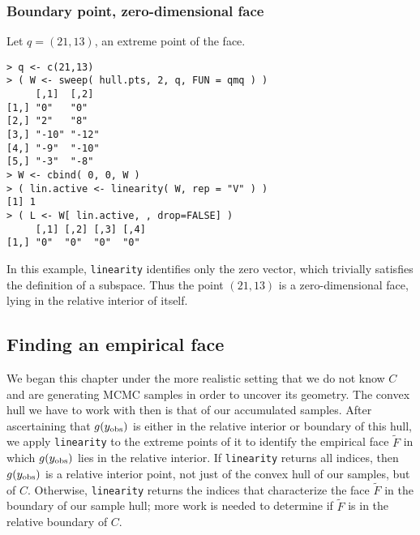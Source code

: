 \subsubsection{Boundary point, zero-dimensional face}
Let $q = (21,13)$, an extreme point of the face.
{ \singlespace
\begin{verbatim}
> q <- c(21,13)
> ( W <- sweep( hull.pts, 2, q, FUN = qmq ) )
     [,1]  [,2] 
[1,] "0"   "0"  
[2,] "2"   "8"  
[3,] "-10" "-12"
[4,] "-9"  "-10"
[5,] "-3"  "-8" 
> W <- cbind( 0, 0, W )
> ( lin.active <- linearity( W, rep = "V" ) )
[1] 1
> ( L <- W[ lin.active, , drop=FALSE] )
     [,1] [,2] [,3] [,4]
[1,] "0"  "0"  "0"  "0" 
\end{verbatim}
}
In this example, \texttt{linearity} identifies only the zero vector, which
trivially satisfies the definition of a subspace.  Thus the point $(21,13)$
is a zero-dimensional face, lying in the relative interior of itself.

\subsection{Finding an empirical face}
We began this chapter under the more realistic setting that we do not know
$C$ and are generating MCMC samples in order to uncover its geometry.  
The convex hull we have to work with then is that of our accumulated samples.
After ascertaining that $g(y_{\text{obs}})$ is either in the relative interior
or boundary of this hull, we apply \texttt{linearity} to the extreme points of it 
to identify the empirical face $\tilde{F}$ in which $g(y_{\text{obs}})$ lies in the relative interior.  
If \texttt{linearity} returns all indices, then $g(y_{\text{obs}})$ is a relative interior point, not just
of the convex hull of our samples, but of $C$.  Otherwise, \texttt{linearity} returns 
the indices that characterize the face $\tilde{F}$ in the boundary of our sample hull; 
more work is needed to determine if $\tilde{F}$ is in the relative boundary of $C$.



